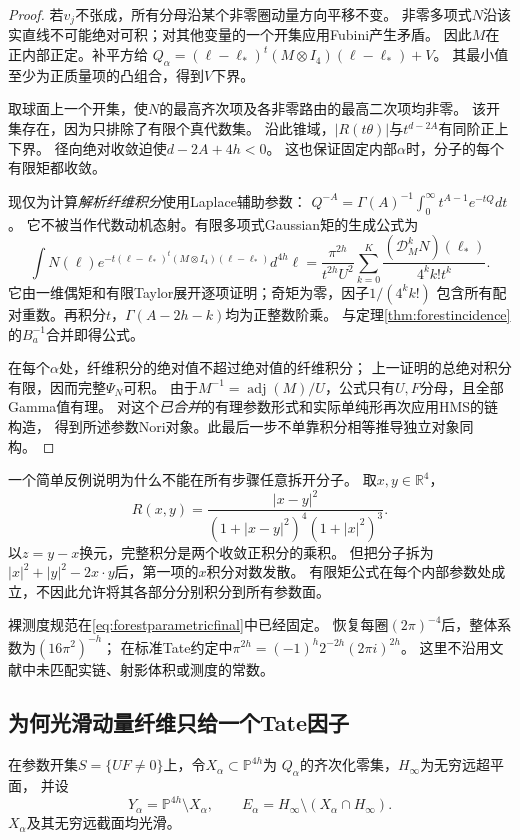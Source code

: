 \documentclass[11pt,a4paper]{ctexart}
\theoremstyle{cnplain}\newtheorem{theorem}{定理}[section]
\theoremstyle{definition}\newtheorem{definition}[theorem]{定义}
\theoremstyle{remark}\newtheorem{remark}[theorem]{注}
\begin{document}
\begin{proof}
若$v_j$不张成，所有分母沿某个非零圈动量方向平移不变。
非零多项式$N$沿该实直线不可能绝对可积；对其他变量的一个开集应用Fubini产生矛盾。
因此$M$在正内部正定。补平方给
$Q_\alpha=(\ell-\ell_*)^t(M\otimes I_4)(\ell-\ell_*)+V$。
其最小值至少为正质量项的凸组合，得到$V$下界。

取球面上一个开集，使$N$的最高齐次项及各非零路由的最高二次项均非零。
该开集存在，因为只排除了有限个真代数集。
沿此锥域，$|R(t\theta)|$与$t^{d-2A}$有同阶正上下界。
径向绝对收敛迫使$d-2A+4h<0$。
这也保证固定内部$\alpha$时，分子的每个有限矩都收敛。

现仅为计算\emph{解析纤维积分}使用Laplace辅助参数：
$Q^{-A}=\Gamma(A)^{-1}\int_0^\infty t^{A-1}e^{-tQ}dt$。
它不被当作代数动机态射。有限多项式Gaussian矩的生成公式为
\[
 \int N(\ell)e^{-t(\ell-\ell_*)^t(M\otimes I_4)(\ell-\ell_*)}d^{4h}\ell
 =\frac{\pi^{2h}}{t^{2h}U^2}
 \sum_{k=0}^{K}\frac{(\mathcal D_M^kN)(\ell_*)}{4^k k!t^k}.
\]
它由一维偶矩和有限Taylor展开逐项证明；奇矩为零，因子$1/(4^kk!)$
包含所有配对重数。再积分$t$，$\Gamma(A-2h-k)$均为正整数阶乘。
与定理\ref{thm:forestincidence}的$B_a^{-1}$合并即得公式。

在每个$\alpha$处，纤维积分的绝对值不超过绝对值的纤维积分；
上一证明的总绝对积分有限，因而完整$\Psi_N$可积。
由于$M^{-1}=\operatorname{adj}(M)/U$，公式只有$U,F$分母，且全部Gamma值有理。
对这个\emph{已合并}的有理参数形式和实际单纯形再次应用HMS的链构造，
得到所述参数Nori对象。此最后一步不单靠积分相等推导独立对象同构。
\end{proof}

一个简单反例说明为什么不能在所有步骤任意拆开分子。
取$x,y\in\mathbb R^4$，
\[
 R(x,y)=\frac{|x-y|^2}{(1+|x-y|^2)^4(1+|x|^2)^3}.
\]
以$z=y-x$换元，完整积分是两个收敛正积分的乘积。
但把分子拆为$|x|^2+|y|^2-2x\cdot y$后，第一项的$x$积分对数发散。
有限矩公式在每个内部参数处成立，不因此允许将其各部分分别积分到所有参数面。

裸测度规范在\eqref{eq:forestparametricfinal}中已经固定。
恢复每圈$(2\pi)^{-4}$后，整体系数为$(16\pi^2)^{-h}$；
在标准Tate约定中$\pi^{2h}=(-1)^h2^{-2h}(2\pi i)^{2h}$。
这里不沿用文献中未匹配实链、射影体积或测度的常数。

\subsection{为何光滑动量纤维只给一个Tate因子}

在参数开集$S=\{U F\ne0\}$上，令$X_\alpha\subset\mathbb P^{4h}$为
$Q_\alpha$的齐次化零集，$H_\infty$为无穷远超平面，
并设
\[
 Y_\alpha=\mathbb P^{4h}\setminus X_\alpha,\qquad
 E_\alpha=H_\infty\setminus(X_\alpha\cap H_\infty).
\]
$X_\alpha$及其无穷远截面均光滑。
\end{document}
